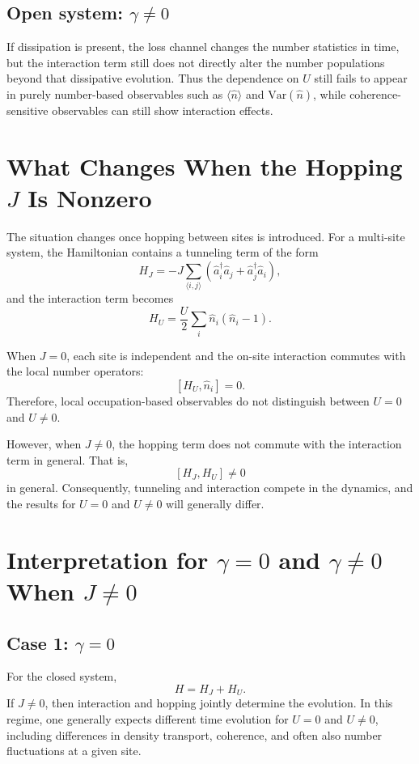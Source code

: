 \documentclass[12pt]{article}
\begin{document}
\subsection*{Open system: $\gamma \neq 0$}
If dissipation is present, the loss channel changes the number statistics in time, but the interaction term still does not directly alter the number populations beyond that dissipative evolution. Thus the dependence on $U$ still fails to appear in purely number-based observables such as $\langle \hat n \rangle$ and $\mathrm{Var}(\hat n)$, while coherence-sensitive observables can still show interaction effects.

\section*{What Changes When the Hopping $J$ Is Nonzero}
The situation changes once hopping between sites is introduced. For a multi-site system, the Hamiltonian contains a tunneling term of the form
\[
H_J = -J \sum_{\langle i,j\rangle}
\left(\hat a_i^\dagger \hat a_j + \hat a_j^\dagger \hat a_i\right),
\]
and the interaction term becomes
\[
H_U = \frac{U}{2}\sum_i \hat n_i(\hat n_i - 1).
\]

When $J=0$, each site is independent and the on-site interaction commutes with the local number operators:
\[
[H_U,\hat n_i] = 0.
\]
Therefore, local occupation-based observables do not distinguish between $U=0$ and $U \neq 0$.

However, when $J \neq 0$, the hopping term does not commute with the interaction term in general. That is,
\[
[H_J,H_U] \neq 0
\]
in general. Consequently, tunneling and interaction compete in the dynamics, and the results for $U=0$ and $U \neq 0$ will generally differ.

\section*{Interpretation for $\gamma = 0$ and $\gamma \neq 0$ When $J \neq 0$}

\subsection*{Case 1: $\gamma = 0$}
For the closed system,
\[
H = H_J + H_U.
\]
If $J \neq 0$, then interaction and hopping jointly determine the evolution. In this regime, one generally expects different time evolution for $U=0$ and $U \neq 0$, including differences in density transport, coherence, and often also number fluctuations at a given site.
\end{document}
